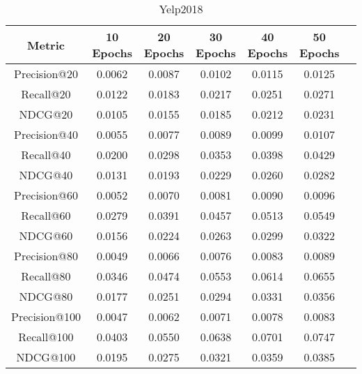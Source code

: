 \documentclass[a4paper,onecolumn]{LTJournalArticle}
\begin{document}
	\begin{table}[h]
		\centering
		\caption{Yelp2018}
		\label{tab:metrics_transposed}
		\scriptsize %
		\begin{tabular}{ccccccc}
			\toprule
			Metric & 10 Epochs & 20 Epochs & 30 Epochs & 40 Epochs & 50 Epochs \\
			\midrule
			Precision@20  & 0.0062  & 0.0087  & 0.0102  & 0.0115  & 0.0125  \\
			Recall@20     & 0.0122  & 0.0183  & 0.0217  & 0.0251  & 0.0271  \\
			NDCG@20       & 0.0105  & 0.0155  & 0.0185  & 0.0212  & 0.0231  \\
			Precision@40  & 0.0055  & 0.0077  & 0.0089  & 0.0099  & 0.0107  \\
			Recall@40     & 0.0200  & 0.0298  & 0.0353  & 0.0398  & 0.0429  \\
			NDCG@40       & 0.0131  & 0.0193  & 0.0229  & 0.0260  & 0.0282  \\
			Precision@60  & 0.0052  & 0.0070  & 0.0081  & 0.0090  & 0.0096  \\
			Recall@60     & 0.0279  & 0.0391  & 0.0457  & 0.0513  & 0.0549  \\
			NDCG@60       & 0.0156  & 0.0224  & 0.0263  & 0.0299  & 0.0322  \\
			Precision@80  & 0.0049  & 0.0066  & 0.0076  & 0.0083  & 0.0089  \\
			Recall@80     & 0.0346  & 0.0474  & 0.0553  & 0.0614  & 0.0655  \\
			NDCG@80       & 0.0177  & 0.0251  & 0.0294  & 0.0331  & 0.0356  \\
			Precision@100 & 0.0047  & 0.0062  & 0.0071  & 0.0078  & 0.0083  \\
			Recall@100    & 0.0403  & 0.0550  & 0.0638  & 0.0701  & 0.0747  \\
			NDCG@100      & 0.0195  & 0.0275  & 0.0321  & 0.0359  & 0.0385  \\
			\bottomrule
		\end{tabular}
	\end{table}
		
\end{document}
